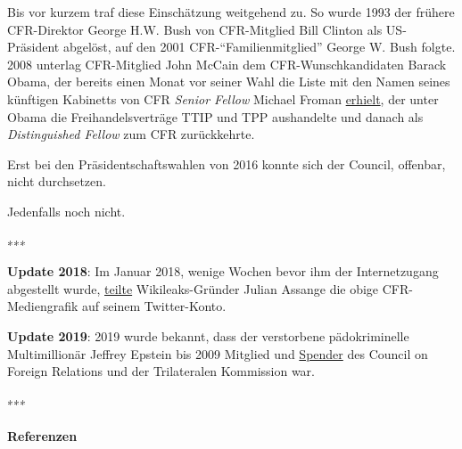 Bis vor kurzem traf diese Einschätzung weitgehend zu. So wurde 1993 der
frühere CFR-Direktor George H.W. Bush von CFR-Mitglied Bill Clinton als
US-Präsident abgelöst, auf den 2001 CFR-``Familienmitglied'' George W.
Bush folgte. 2008 unterlag CFR-Mitglied John McCain dem
CFR-Wunschkandidaten Barack Obama, der bereits einen Monat vor seiner
Wahl die Liste mit den Namen seines künftigen Kabinetts von CFR
\emph{Senior Fellow} Michael Froman
\href{http://observer.com/2016/10/obama-makes-first-appearance-in-wikileaks-receives-admin-list-from-big-banker/}{erhielt},
der unter Obama die Freihandelsverträge TTIP und TPP aushandelte und
danach als \emph{Distinguished Fellow} zum CFR zurückkehrte.

Erst bei den Präsidentschaftswahlen von 2016 konnte sich der Council,
offenbar, nicht durchsetzen.

Jedenfalls noch nicht.

∗∗∗

\textbf{Update 2018}: Im Januar 2018, wenige Wochen bevor ihm der
Internetzugang abgestellt wurde,
\href{https://swprs.files.wordpress.com/2018/01/assange-tweet.png}{teilte}
Wikileaks-Gründer Julian Assange die obige CFR-Mediengrafik auf seinem
Twitter-Konto.

\textbf{Update 2019}: 2019 wurde bekannt, dass der verstorbene
pädokriminelle Multimillionär Jeffrey Epstein bis 2009 Mitglied und
\href{https://www.washingtonpost.com/politics/council-on-foreign-relations-another-beneficiary-of-epstein-largesse-grapples-with-how-to-handle-his-donations/2019/09/10/1d5630e2-d324-11e9-86ac-0f250cc91758_story.html}{Spender}
des Council on Foreign Relations und der Trilateralen Kommission war.

∗∗∗

\hypertarget{referenzen}{%
\paragraph{Referenzen}\label{referenzen}}

